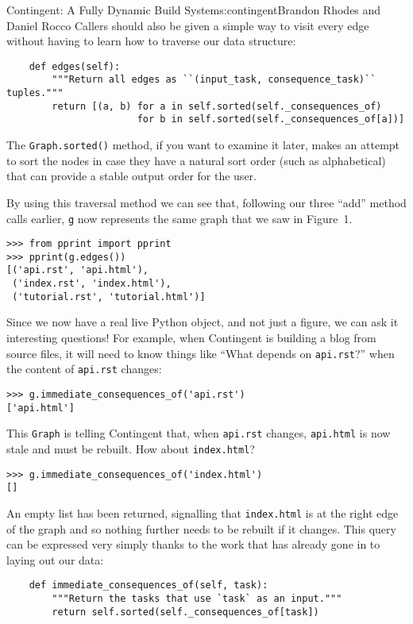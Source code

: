 \begin{aosachapter}{Contingent: A Fully Dynamic Build System}{s:contingent}{Brandon Rhodes and Daniel Rocco}
Callers should also be given a simple way to visit every edge without
having to learn how to traverse our data structure:

\begin{verbatim}
    def edges(self):
        """Return all edges as ``(input_task, consequence_task)`` tuples."""
        return [(a, b) for a in self.sorted(self._consequences_of)
                       for b in self.sorted(self._consequences_of[a])]
\end{verbatim}

The \texttt{Graph.sorted()} method, if you want to examine it later,
makes an attempt to sort the nodes in case they have a natural sort
order (such as alphabetical) that can provide a stable output order for
the user.

By using this traversal method we can see that, following our three
``add'' method calls earlier, \texttt{g} now represents the same graph
that we saw in Figure~1.

\begin{verbatim}
>>> from pprint import pprint
>>> pprint(g.edges())
[('api.rst', 'api.html'),
 ('index.rst', 'index.html'),
 ('tutorial.rst', 'tutorial.html')]
\end{verbatim}

Since we now have a real live Python object, and not just a figure, we
can ask it interesting questions! For example, when Contingent is
building a blog from source files, it will need to know things like
``What depends on \texttt{api.rst}?'' when the content of
\texttt{api.rst} changes:

\begin{verbatim}
>>> g.immediate_consequences_of('api.rst')
['api.html']
\end{verbatim}

This \texttt{Graph} is telling Contingent that, when \texttt{api.rst}
changes, \texttt{api.html} is now stale and must be rebuilt. How about
\texttt{index.html}?

\begin{verbatim}
>>> g.immediate_consequences_of('index.html')
[]
\end{verbatim}

An empty list has been returned, signalling that \texttt{index.html} is
at the right edge of the graph and so nothing further needs to be
rebuilt if it changes. This query can be expressed very simply thanks to
the work that has already gone in to laying out our data:

\begin{verbatim}
    def immediate_consequences_of(self, task):
        """Return the tasks that use `task` as an input."""
        return self.sorted(self._consequences_of[task])
\end{verbatim}


\end{aosachapter}
